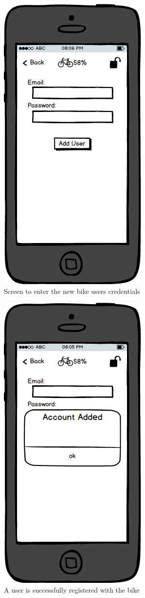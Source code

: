 \documentclass[a4paper]{report}
\begin{document}
\clearpage
\begin{figure}
\centering
\includegraphics[scale=0.9]{figures/prototype_2/add_user}
\caption{Screen to enter the new bike users credentials}
\end{figure}
\clearpage\begin{figure}
\centering
\includegraphics[scale=0.9]{figures/prototype_2/account_added}
\caption{A user is successfully registered with the bike}
\end{figure}
\end{document}
